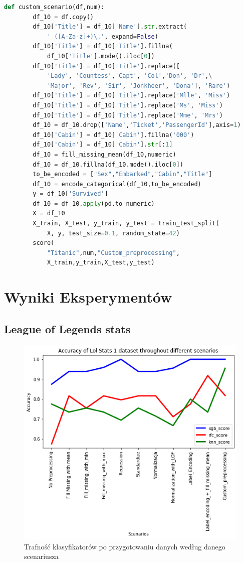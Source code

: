 \documentclass{book}
\begin{document}
\begin{lstlisting}[language=Python, caption={Usuwanie 
    wartości odstających}, captionpos=b]
    def custom_scenario(df,num):
        df_10 = df.copy()
        df_10['Title'] = df_10['Name'].str.extract(
            ' ([A-Za-z]+)\.', expand=False)
        df_10['Title'] = df_10['Title'].fillna(
            df_10['Title'].mode().iloc[0])
        df_10['Title'] = df_10['Title'].replace([
            'Lady', 'Countess','Capt', 'Col','Don', 'Dr',\
            'Major', 'Rev', 'Sir', 'Jonkheer', 'Dona'], 'Rare')
        df_10['Title'] = df_10['Title'].replace('Mlle', 'Miss')
        df_10['Title'] = df_10['Title'].replace('Ms', 'Miss')
        df_10['Title'] = df_10['Title'].replace('Mme', 'Mrs')
        df_10 = df_10.drop(['Name','Ticket','PassengerId'],axis=1)
        df_10['Cabin'] = df_10['Cabin'].fillna('000')
        df_10['Cabin'] = df_10['Cabin'].str[:1]
        df_10 = fill_missing_mean(df_10,numeric)
        df_10 = df_10.fillna(df_10.mode().iloc[0])
        to_be_encoded = ["Sex","Embarked","Cabin","Title"]
        df_10 = encode_categorical(df_10,to_be_encoded)
        y = df_10['Survived']
        df_10 = df_10.apply(pd.to_numeric)
        X = df_10
        X_train, X_test, y_train, y_test = train_test_split(
            X, y, test_size=0.1, random_state=42)
        score(
            "Titanic",num,"Custom_preprocessing",
            X_train,y_train,X_test,y_test)
\end{lstlisting}

\section{Wyniki Eksperymentów}
\subsection{League of Legends stats}
\begin{figure}[H]
\centerline{\includegraphics{Lol_Stats_1}}
\centering
\caption{Trafność klasyfikatorów po przygotowaniu danych 
według danego scenariusza}

\end{figure}
\end{document}
